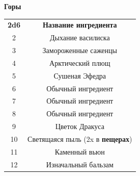 \documentclass[a4paper, 9pt, twocolumn]{book}
\begin{document}
	\begin{table}[H]
		
		{\Large \textbf{Горы}}
		
		\medspace 
		
		\centering 
		
		\begin{tabularx}{\linewidth}{c C}
			
			\textbf{2d6} & \textbf{Название ингредиента} \\
			
			2 & Дыхание василиска  \\
			
			3 & Замороженные саженцы  \\
			
			4 & Арктический плющ \\
			
			5 & Сушеная Эфедра  \\
			
			6 & Обычный ингредиент \\
			
			7 & Обычный ингредиент \\
			
			8 & Обычный ингредиент \\
			
			9 & Цветок Дракуса  \\
			
			10 & Светящаяся пыль (2x в \textbf{пещерах}) \\
			
			11 & Каменный вьюн  \\
			
			12 & Изначальный бальзам  \\
		\end{tabularx}
	\end{table}
\end{document}

